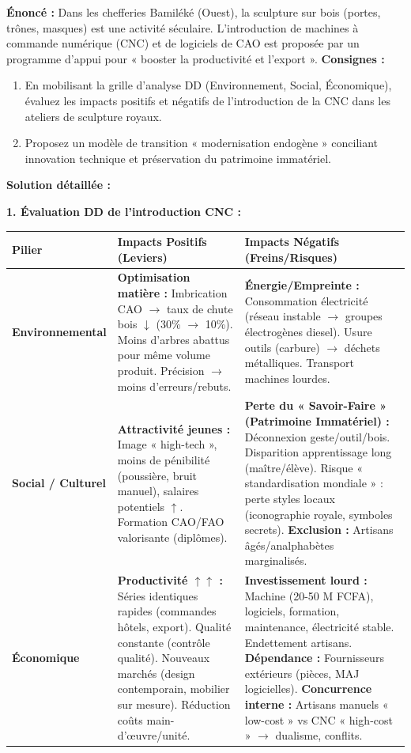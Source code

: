\documentclass[11pt]{article}
\begin{document}
\begin{exoresolu}
\textbf{Énoncé :} Dans les chefferies Bamiléké (Ouest), la sculpture sur bois (portes, trônes, masques) est une activité séculaire. L'introduction de machines à commande numérique (CNC) et de logiciels de CAO est proposée par un programme d'appui pour « booster la productivité et l'export ».
\textbf{Consignes :}
\begin{enumerate}
    \item En mobilisant la grille d'analyse DD (Environnement, Social, Économique), évaluez les impacts positifs et négatifs de l'introduction de la CNC dans les ateliers de sculpture royaux.
    \item Proposez un modèle de transition « modernisation endogène » conciliant innovation technique et préservation du patrimoine immatériel.
\end{enumerate}
\tcblower
\textbf{Solution détaillée :}

\textbf{1. Évaluation DD de l'introduction CNC :}

\begin{center}
\begin{tabularx}{\linewidth}{|l|X|X|}\hline
\textbf{Pilier} & \textbf{Impacts Positifs (Leviers)} & \textbf{Impacts Négatifs (Freins/Risques)} \\ \hline
\textbf{Environnemental} & \textbf{Optimisation matière :} Imbrication CAO $\rightarrow$ taux de chute bois $\downarrow$ (30\% $\rightarrow$ 10\%). Moins d'arbres abattus pour même volume produit. Précision $\rightarrow$ moins d'erreurs/rebuts. & \textbf{Énergie/Empreinte :} Consommation électricité (réseau instable $\rightarrow$ groupes électrogènes diesel). Usure outils (carbure) $\rightarrow$ déchets métalliques. Transport machines lourdes. \\ \hline
\textbf{Social / Culturel} & \textbf{Attractivité jeunes :} Image « high-tech », moins de pénibilité (poussière, bruit manuel), salaires potentiels $\uparrow$. Formation CAO/FAO valorisante (diplômes). & \textbf{Perte du « Savoir-Faire » (Patrimoine Immatériel) :} Déconnexion geste/outil/bois. Disparition apprentissage long (maître/élève). Risque « standardisation mondiale » : perte styles locaux (iconographie royale, symboles secrets). \textbf{Exclusion :} Artisans âgés/analphabètes marginalisés. \\ \hline
\textbf{Économique} & \textbf{Productivité $\uparrow\uparrow$ :} Séries identiques rapides (commandes hôtels, export). Qualité constante (contrôle qualité). Nouveaux marchés (design contemporain, mobilier sur mesure). Réduction coûts main-d'œuvre/unité. & \textbf{Investissement lourd :} Machine (20-50 M FCFA), logiciels, formation, maintenance, électricité stable. Endettement artisans. \textbf{Dépendance :} Fournisseurs extérieurs (pièces, MAJ logicielles). \textbf{Concurrence interne :} Artisans manuels « low-cost » vs CNC « high-cost » $\rightarrow$ dualisme, conflits. \\ \hline
\end{tabularx}
\end{center}


\end{exoresolu}
\end{document}
